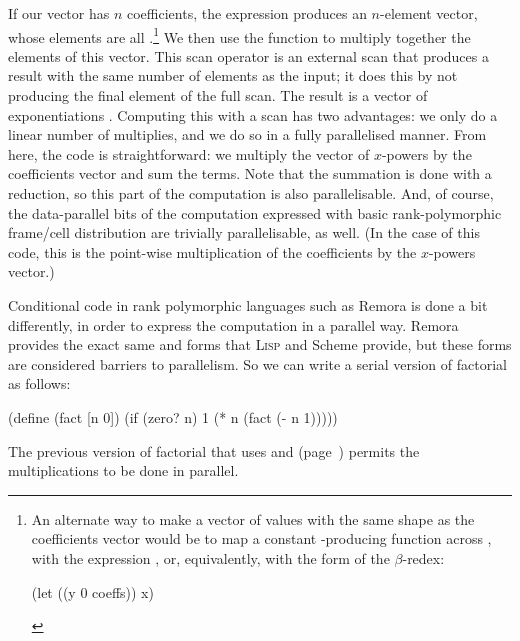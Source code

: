 If our  vector has $n$ coefficients,
the  expression produces an $n$-element vector,
whose elements are all .\footnote{
  An alternate way to make a vector of  values with the
  same shape as the coefficients vector would be to
  map a constant -producing function across ,
  with the expression , or,
  equivalently, with the  form of the $\beta$-redex:
\begin{code}
(let ((y 0 coeffs)) x)\end{code}
}
We then use the  function to multiply together
the elements of this vector.
This scan operator is an external scan that produces a result with
the same number of elements as the input;
it does this by not producing the final element of the full scan.
The result is a vector of exponentiations \ex{[$x^0$ $x^1$ {\ldots} $x^{n-1}$]}.
Computing this with a scan has two advantages:
we only do a linear number of multiplies,
and we do so in a fully parallelised manner.
From here, the code is straightforward: we multiply the vector of $x$-powers
by the coefficients vector and sum the terms.
Note that the summation is done with a reduction,
so this part of the computation is also parallelisable.
And, of course, the data-parallel bits of the computation
expressed with basic rank-polymorphic frame/cell distribution are
trivially parallelisable, as well.
(In the case of this code, this is the point-wise multiplication
of the coefficients by the $x$-powers vector.)

\label{sec:conditional-code}

Conditional code in rank polymorphic languages such as Remora is
done a bit differently,
in order to express the computation in a parallel way.
Remora provides the exact same  and  forms
that \textsc{Lisp} and Scheme provide,
but these forms are considered barriers to parallelism.
So we can write a serial version of factorial as follows:
\begin{code}
(define (fact [n 0])
  (if (zero? n) 1
      (* n (fact (- n 1)))))\end{code}
The previous version of factorial that uses  and 
(page~\pageref{example:factorial})
permits the multiplications to be done in parallel.

